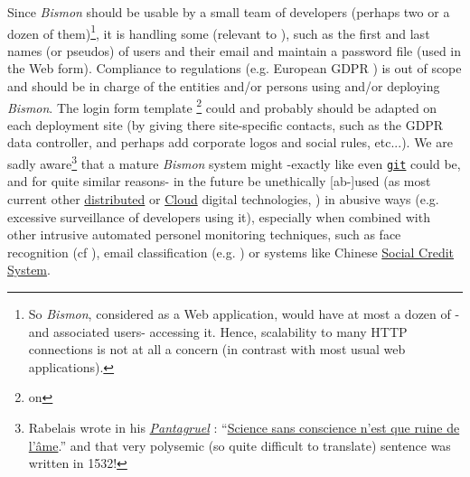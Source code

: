 \begin{itemize}
      Since \textit{Bismon} should be usable by a small team of
      developers (perhaps two or a dozen of them)\footnote{So
      \textit{Bismon}, considered as a Web application, would have at
      most a dozen of  -and associated users-
      accessing it. Hence, scalability to many HTTP connections is not
      at all a concern (in contrast with most usual web
      applications).}, it is handling some  (relevant to ), such as
      the first and last names (or pseudos) of users and their email
      and maintain a password file (used in the Web
       form). Compliance to
       regulations (e.g. European GDPR
      \cite{voigt:2017:eu-gdpr, zuboff:2015:big-other}) is out of
      scope and should be in charge of the entities and/or persons
      using and/or deploying \textit{Bismon}. The login  form template \footnote{on
      }
      could and probably should be adapted on each deployment site (by
      giving there site-specific contacts, such as the GDPR data
      controller, and perhaps add corporate logos and social rules,
      etc...). We are sadly aware\footnote{Rabelais wrote in his
      \href{https://en.wikipedia.org/wiki/Gargantua\_and\_Pantagruel#Pantagruel}{\emph{Pantagruel}}
      :
      ``\href{https://www.linguee.com/french-english/translation/sciences+sans+conscience+n\%27est+que+ruine+de+l\%27\%C3\%A2me.html}{Science
        sans conscience n'est que ruine de l'âme}.''  and that very
      polysemic (so quite difficult to translate) sentence was written
      in 1532!} that a mature \textit{Bismon} system might -exactly
      like even \href{http://git-scm.com}{\texttt{git}}
       could be, and for quite similar
      reasons- in the future be unethically  [ab-]used
      (as most current other
      \href{https://en.wikipedia.org/wiki/Distributed\_computing}{distributed}
      or \href{https://en.wikipedia.org/wiki/Cloud\_computing}{Cloud}
      digital technologies, \cite{thain:2005:distributed-computing,
        dikaiakos:2009:cloud, attiya:2004:distributed,
        peleg:2000:distributed}) in abusive ways (e.g. excessive
       surveillance
      \cite{helbing:2019:big-data-democracy, zuboff:2015:big-other,
        oneil:2016:weapons} of developers using it), especially when
      combined with other intrusive automated personel
       monitoring techniques, such as face recognition
       (cf \cite{jain:2011:face-recognition}),
       email classification
      (e.g. \cite{klimt:2004:enron}) or systems like Chinese
      \href{https://en.wikipedia.org/wiki/Social\_Credit\_System}{Social
        Credit System}.


\end{itemize}
